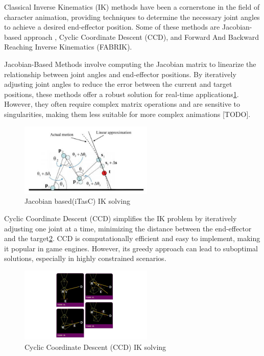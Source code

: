 \documentclass[../../main.tex]{subfiles}
\begin{document}
Classical Inverse Kinematics (IK) methods have been a cornerstone in the field of character animation, providing techniques to determine the necessary joint angles to achieve a desired end-effector position. Some of these methods are Jacobian-based approach \cite{TODO itasc}, Cyclic Coordinate Descent (CCD)\cite{TODO}, and Forward And Backward Reaching Inverse Kinematics (FABRIK)\cite{TODO}.

Jacobian-Based Methods involve computing the Jacobian matrix to linearize the relationship between joint angles and end-effector positions. By iteratively adjusting joint angles to reduce the error between the current and target positions, these methods offer a robust solution for real-time applications\ref{fig:jacobian_based}. However, they often require complex matrix operations and are sensitive to singularities, making them less suitable for more complex animations [TODO].

\begin{figure}
    \centering \includegraphics[width = 2.5in]{chapters/motion_matching/images/jacobian_based.png}
    \caption{Jacobian based(iTasC) IK solving}
    \label{fig:jacobian_based}
\end{figure}

Cyclic Coordinate Descent (CCD) simplifies the IK problem by iteratively adjusting one joint at a time, minimizing the distance between the end-effector and the target\ref{fig:ccdik}. CCD is computationally efficient and easy to implement, making it popular in game engines. However, its greedy approach can lead to suboptimal solutions, especially in highly constrained scenarios\cite{TODO}.

\begin{figure}
  \centering \includegraphics[width = 2.5in]{chapters/motion_matching/images/ccdik.png}
  \caption{Cyclic Coordinate Descent (CCD) IK solving}
  \label{fig:ccdik}
\end{figure}
\end{document}

